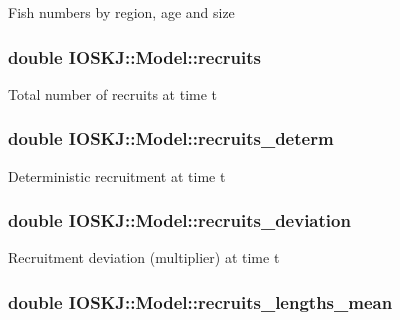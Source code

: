 Fish numbers by region, age and size \hypertarget{classIOSKJ_1_1Model_a8ffa15a7aea7598d5a6c91bec5779ef3}{
\subsubsection[{recruits}]{\setlength{\rightskip}{0pt plus 5cm}double I\-O\-S\-K\-J\-::\-Model\-::recruits}}\label{classIOSKJ_1_1Model_a8ffa15a7aea7598d5a6c91bec5779ef3}
Total number of recruits at time t \hypertarget{classIOSKJ_1_1Model_ad2450f5604c657cbe259b7b49e8f905a}{
\subsubsection[{recruits\-\_\-determ}]{\setlength{\rightskip}{0pt plus 5cm}double I\-O\-S\-K\-J\-::\-Model\-::recruits\-\_\-determ}}\label{classIOSKJ_1_1Model_ad2450f5604c657cbe259b7b49e8f905a}
Deterministic recruitment at time t \hypertarget{classIOSKJ_1_1Model_a639afa6cd0480ad8c6dbac286bdaa55c}{
\subsubsection[{recruits\-\_\-deviation}]{\setlength{\rightskip}{0pt plus 5cm}double I\-O\-S\-K\-J\-::\-Model\-::recruits\-\_\-deviation}}\label{classIOSKJ_1_1Model_a639afa6cd0480ad8c6dbac286bdaa55c}
Recruitment deviation (multiplier) at time t \hypertarget{classIOSKJ_1_1Model_a6bb5b6a203c92c799dd2c34cf0fe1423}{
\subsubsection[{recruits\-\_\-lengths\-\_\-mean}]{\setlength{\rightskip}{0pt plus 5cm}double I\-O\-S\-K\-J\-::\-Model\-::recruits\-\_\-lengths\-\_\-mean}}\label{classIOSKJ_1_1Model_a6bb5b6a203c92c799dd2c34cf0fe1423}
